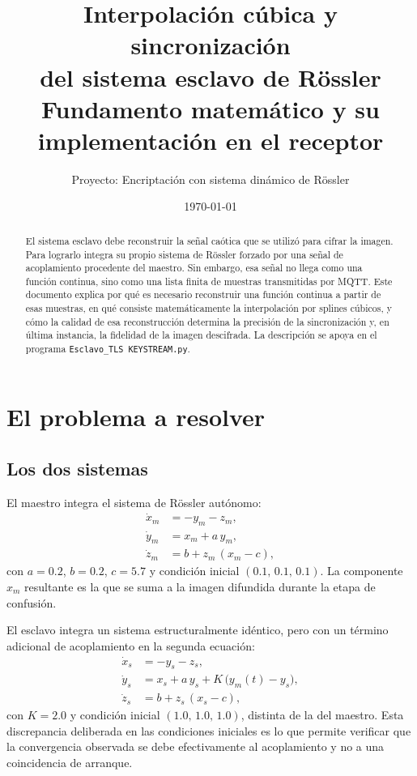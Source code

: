 \documentclass[12pt,a4paper]{article}
\title{\textbf{Interpolación cúbica y sincronización\\ del sistema esclavo de Rössler}\\[0.3cm]
\large Fundamento matemático y su implementación en el receptor}
\author{Proyecto: Encriptación con sistema dinámico de Rössler}
\date{\today}
\begin{document}
\maketitle

\begin{abstract}
\noindent
El sistema esclavo debe reconstruir la señal caótica que se utilizó para cifrar la imagen. Para lograrlo integra su propio sistema de Rössler forzado por una señal de acoplamiento procedente del maestro. Sin embargo, esa señal no llega como una función continua, sino como una lista finita de muestras transmitidas por MQTT. Este documento explica por qué es necesario reconstruir una función continua a partir de esas muestras, en qué consiste matemáticamente la interpolación por splines cúbicos, y cómo la calidad de esa reconstrucción determina la precisión de la sincronización y, en última instancia, la fidelidad de la imagen descifrada. La descripción se apoya en el programa \texttt{Esclavo\_TLS KEYSTREAM.py}.
\end{abstract}

\tableofcontents
\newpage

\section{El problema a resolver}

\subsection{Los dos sistemas}

El maestro integra el sistema de Rössler autónomo:
\begin{equation}
\begin{aligned}
\dot{x}_m &= -y_m - z_m,\\
\dot{y}_m &= x_m + a\,y_m,\\
\dot{z}_m &= b + z_m\,(x_m - c),
\end{aligned}
\label{eq:maestro}
\end{equation}
con $a = 0.2$, $b = 0.2$, $c = 5.7$ y condición inicial $(0.1,\,0.1,\,0.1)$. La componente $x_m$ resultante es la que se suma a la imagen difundida durante la etapa de confusión.

El esclavo integra un sistema estructuralmente idéntico, pero con un término adicional de acoplamiento en la segunda ecuación:
\begin{equation}
\begin{aligned}
\dot{x}_s &= -y_s - z_s,\\
\dot{y}_s &= x_s + a\,y_s + K\,\bigl(y_m(t) - y_s\bigr),\\
\dot{z}_s &= b + z_s\,(x_s - c),
\end{aligned}
\label{eq:esclavo}
\end{equation}
con $K = 2.0$ y condición inicial $(1.0,\,1.0,\,1.0)$, distinta de la del maestro. Esta discrepancia deliberada en las condiciones iniciales es lo que permite verificar que la convergencia observada se debe efectivamente al acoplamiento y no a una coincidencia de arranque.
\end{document}
